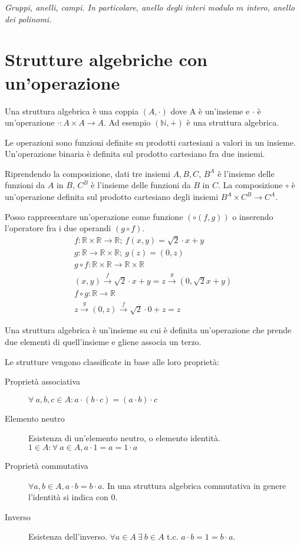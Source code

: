 
\begin{center}
\indent
\textit{Gruppi, anelli, campi. In particolare, anello degli interi modulo $m$ intero, anello dei polinomi.}
\end{center}

\section{Strutture algebriche con un'operazione}

Una struttura algebrica \`e una coppia $(A, \cdot)$ dove A \`e un'insieme e $\cdot$ \`e un'operazione $\cdot : A \times A \to A$. Ad esempio $(\mathbb{N}, +)$ \`e una struttura algebrica.

Le operazioni sono funzioni definite su prodotti cartesiani a valori in un insieme. Un'operazione binaria \`e definita sul prodotto cartesiano fra due insiemi.

Riprendendo la composizione, dati tre insiemi $A, B, C$, $B^A$ \`e l'insieme delle funzioni da $A$ in $B$, $C^B$ \`e l'insieme delle funzioni da $B$ in $C$. La composizione $\circ$ \`e un'operazione definita sul prodotto cartesiano degli insiemi $B^A \times C^B \to C^A$.

Posso rappresentare un'operazione come funzione $(\circ \left( f, g \right))$ o inserendo l'operatore fra i due operandi $ (g \circ f) $.
\begin{gather*}
f: \mathbb{R} \times \mathbb{R} \to \mathbb{R} ; \
f(x,y) = \sqrt{2} \cdot x + y \\
g: \mathbb{R} \to \mathbb{R} \times \mathbb{R} ; \
g(z) = (0,z) \\
g \circ f : \mathbb{R} \times \mathbb{R} \to \mathbb{R} \times \mathbb{R} \\
(x,y) \xrightarrow{f} \sqrt{2} \cdot x + y = z \xrightarrow{g} \left( 0, \sqrt{2}x + y \right) \\
f \circ g : \mathbb{R} \to \mathbb{R} \\
z \xrightarrow{g} (0,z) \xrightarrow{f} \sqrt{2} \cdot 0 + z = z
\end{gather*}

Una struttura algebrica \`e un'insieme su cui \`e definita un'operazione che prende due elementi di quell'insieme e gliene associa un terzo.

Le strutture vengono classificate in base alle loro propriet\`a:
\begin{description}
    \item[Propriet\`a associativa\label{itm:strutture_associativa}] $\forall \ a, b, c \in A : a \cdot (b \cdot c) = (a \cdot b) \cdot c$
    \item[Elemento neutro\label{itm:strutture_neutro}] Esistenza di un'elemento neutro, o elemento identit\`a. $1 \in A : \forall \ a \in A , a \cdot 1 = a = 1 \cdot a$
    \item[Propriet\`a commutativa\label{itm:strutture_commutativa}] $ \forall a, b \in A , a \cdot b = b \cdot a $. In una struttura algebrica commutativa in genere l'identit\`a si indica con 0.
    \item[Inverso\label{itm:strutture_inverso}] Esistenza dell'inverso. $ \forall a \in A \ \exists \ b \in A $ t.c. $a \cdot b = 1 = b \cdot a $.
\end{description}

